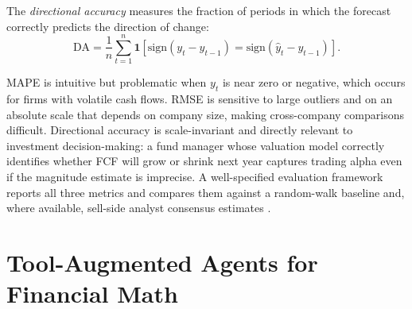 \begin{deepdive}
\begin{definition}
\label{def:da}
The \emph{directional accuracy} measures the fraction of periods in which the forecast
correctly predicts the direction of change:
\begin{equation}
\label{eq:da}
\mathrm{DA} = \frac{1}{n}\sum_{t=1}^{n}
  \mathbf{1}\!\left[\mathrm{sign}(y_t - y_{t-1}) = \mathrm{sign}(\hat{y}_t - y_{t-1})\right].
\end{equation}
\end{definition}

MAPE is intuitive but problematic when $y_t$ is near zero or negative, which occurs
for firms with volatile cash flows. RMSE is sensitive to large outliers and on an
absolute scale that depends on company size, making cross-company comparisons difficult.
Directional accuracy is scale-invariant and directly relevant to investment
decision-making: a fund manager whose valuation model correctly identifies whether FCF
will grow or shrink next year captures trading alpha even if the magnitude estimate is
imprecise. A well-specified evaluation framework reports all three metrics and compares
them against a random-walk baseline and, where available, sell-side analyst consensus
estimates \citep{zhang2024financebench}.
\end{deepdive}


\section{Tool-Augmented Agents for Financial Math}
\label{sec:bv-tools}

